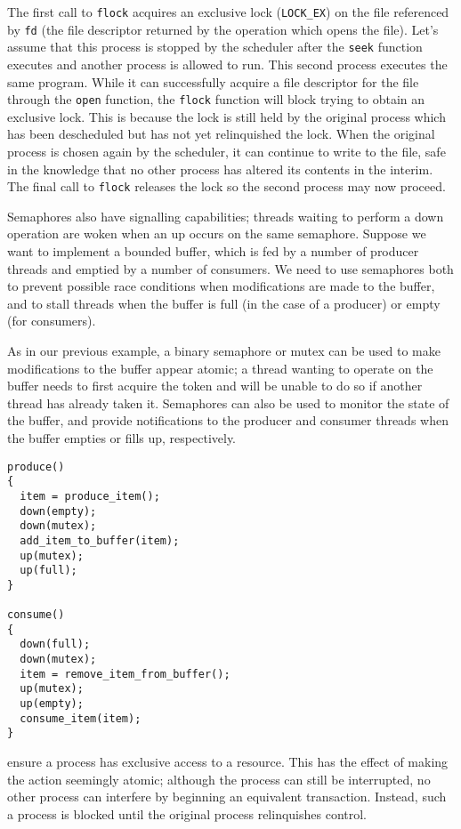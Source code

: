 The first call to \texttt{flock} acquires an exclusive lock
(\texttt{LOCK\_EX}) on the file referenced by \texttt{fd} (the file
descriptor returned by the operation which opens the file).  Let's
assume that this process is stopped by the scheduler after the
\texttt{seek} function executes and another process is allowed to run.
This second process executes the same program.  While it can
successfully acquire a file descriptor for the file through the
\texttt{open} function, the \texttt{flock} function will block trying
to obtain an exclusive lock.  This is because the lock is still held
by the original process which has been descheduled but has not yet
relinquished the lock.  When the original process is chosen again by
the scheduler, it can continue to write to the file, safe in the
knowledge that no other process has altered its contents in the
interim.  The final call to \texttt{flock} releases the lock so the
second process may now proceed.

Semaphores also have signalling capabilities; threads waiting to
perform a down operation are woken when an up occurs on the same
semaphore.  Suppose we want to implement a bounded buffer, which is
fed by a number of producer threads and emptied by a number of
consumers.  We need to use semaphores both to prevent possible race
conditions when modifications are made to the buffer, and to stall
threads when the buffer is full (in the case of a producer) or empty
(for consumers).

As in our previous example, a binary semaphore or mutex can be used to
make modifications to the buffer appear atomic; a thread wanting to
operate on the buffer needs to first acquire the token and will be
unable to do so if another thread has already taken it.  Semaphores
can also be used to monitor the state of the buffer, and provide
notifications to the producer and consumer threads when the buffer
empties or fills up, respectively.

\begin{verbatim}
produce()
{
  item = produce_item();
  down(empty);
  down(mutex);
  add_item_to_buffer(item);
  up(mutex);
  up(full);
}

consume()
{
  down(full);
  down(mutex);
  item = remove_item_from_buffer();
  up(mutex);
  up(empty);
  consume_item(item);
}
\end{verbatim}
 
  ensure a process has exclusive access to a resource.  This has the
  effect of making the action seemingly atomic; although the process
  can still be interrupted, no other process can interfere by
  beginning an equivalent transaction.  Instead, such a process is
  blocked until the original process relinquishes control.

